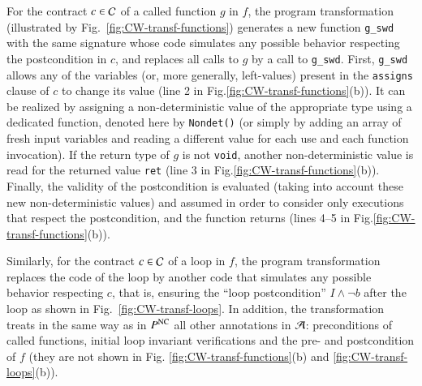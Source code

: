 For the contract $c\in{\ensuremath\mathcal{C}}$ of a called function $g$ in $f$, 
the program transformation  (illustrated by Fig.~\ref{fig:CW-transf-functions})
generates a new function \lstinline{g_swd} with the same signature 
whose code simulates any possible behavior respecting the postcondition in $c$, 
and replaces all calls to $g$ by  a call to \lstinline{g_swd}.
First, \lstinline{g_swd} allows any of the variables
(or, more generally, left-values) present in
the \lstinline{assigns} clause of $c$ to change its value 
(line 2 in Fig.\ref{fig:CW-transf-functions}(b)).
It can be realized by assigning a non-deterministic 
value of the appropriate type
using a dedicated function, denoted here by \lstinline{Nondet()}
(or simply by adding an array of fresh input variables and reading
a different value for each use and each function invocation).
If the return type of $g$ is not \lstinline{void},
another non-deterministic value is read for the returned value
\lstinline{ret} (line 3 in Fig.\ref{fig:CW-transf-functions}(b)).
Finally, the validity of the postcondition is evaluated (taking into
account these new non-deterministic values) 
and assumed
in order to consider only executions that respect 
the postcondition, and
the function returns (lines 4--5 in Fig.\ref{fig:CW-transf-functions}(b)).

Similarly, for the contract $c\in{\ensuremath\mathcal{C}}$ of a loop in $f$, 
the program transformation  
replaces the code of the loop by 
another code that simulates any possible behavior respecting $c$, that is, 
ensuring the ``loop postcondition'' $I\wedge \neg b$ after the loop as shown in Fig.~\ref{fig:CW-transf-loops}.
In addition, the transformation treats in the same way as in $P^{\mathrm{NC}}$
all other annotations in ${\mathcal{A}}$:
preconditions of called functions, initial loop invariant verifications 
and the  pre- and postcondition of $f$
(they are not shown 
in Fig. \ref{fig:CW-transf-functions}(b) and \ref{fig:CW-transf-loops}(b)).

